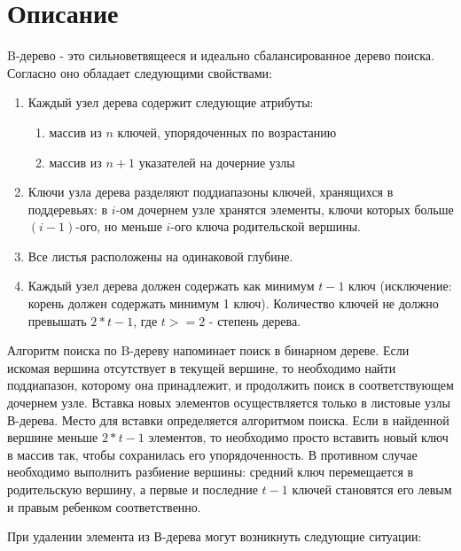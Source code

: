 \section{Описание}

B-дерево - это сильноветвящееся и идеально сбалансированное дерево поиска. Согласно \cite{Kormen} оно обладает следующими
свойствами:

\begin{enumerate} 
	\item Каждый узел дерева содержит следующие атрибуты:
	\begin{enumerate} 
		\item массив из $n$ ключей, упорядоченных по возрастанию
		\item массив из $n + 1$ указателей на дочерние узлы
	\end{enumerate} 
	\item Ключи узла дерева разделяют поддиапазоны ключей, хранящихся в поддеревьях: в $i$-ом дочернем узле хранятся элементы, 
	ключи которых больше $(i - 1)$-ого, но меньше $i$-ого ключа родительской вершины.
	\item Все листья расположены на одинаковой глубине.
	\item Каждый узел дерева должен содержать как минимум $t - 1$ ключ (исключение: корень должен содержать минимум 1 ключ). 
	Количество ключей не должно превышать $2 * t - 1$, где $t >= 2$ - степень дерева.
\end{enumerate}

Алгоритм поиска по B-дереву напоминает поиск в бинарном дереве. Если искомая вершина отсутствует в текущей вершине, 
то необходимо найти поддиапазон, которому она принадлежит, и продолжить поиск в соответствующем дочернем узле.
Вставка новых элементов осуществляется только в листовые узлы В-дерева. Место для вставки определяется алгоритмом поиска. 
Если в найденной вершине меньше $2 * t - 1$ элементов, то необходимо просто вставить новый ключ в массив так, чтобы
сохранилась его упорядоченность. В противном случае необходимо выполнить разбиение вершины: средний ключ перемещается 
в родительскую вершину, а первые и последние $t - 1$ ключей становятся его левым и правым ребенком соответственно.

При удалении элемента из В-дерева могут возникнуть следующие ситуации:

